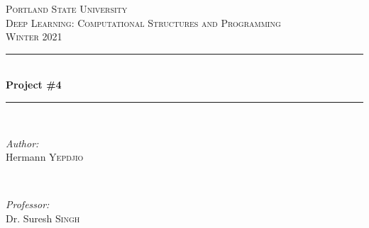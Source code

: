 \documentclass[12pt]{article}
\begin{document}
	
	\begin{titlepage}
		
		\newcommand{\HRule}{\rule{\linewidth}{0.5mm}} %
		
		\center %
		
		
		\textsc{\LARGE Portland State University}\\[1.5cm] %
		\textsc{\Large Deep Learning: Computational Structures and Programming}\\[0.5cm] %
		\textsc{\large Winter 2021}\\[0.5cm] %
		
		
		\HRule \\[0.4cm]
		{ \huge \bfseries Project \#4}\\[0.4cm] %
		\HRule \\[1.5cm]
		
		
		\begin{minipage}{0.4\textwidth}
			\begin{flushleft} \large
				\emph{Author:}\\
				Hermann \textsc{Yepdjio} %
			\end{flushleft}
		\end{minipage}
		~
		\begin{minipage}{0.4\textwidth}
			\begin{flushright} \large
				\emph{Professor:} \\
				Dr. Suresh \textsc{Singh} %
			\end{flushright}
		\end{minipage}\\[1cm]
		

\end{titlepage}
\end{document}
